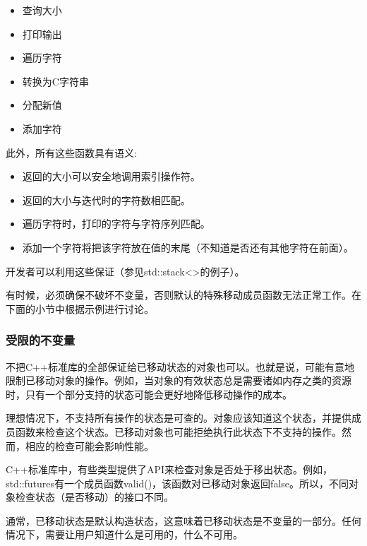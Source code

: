 \begin{itemize}
	\item 查询大小
	\item 打印输出
	\item 遍历字符
	\item 转换为C字符串
	\item 分配新值
	\item 添加字符
\end{itemize}

此外，所有这些函数具有语义:

\begin{itemize}
	\item 返回的大小可以安全地调用索引操作符。
	\item 返回的大小与迭代时的字符数相匹配。
	\item 遍历字符时，打印的字符与字符序列匹配。
	\item 添加一个字符将把该字符放在值的末尾（不知道是否还有其他字符在前面）。
\end{itemize}

开发者可以利用这些保证（参见std::stack<>的例子）。

有时候，必须确保不破坏不变量，否则默认的特殊移动成员函数无法正常工作。在下面的小节中根据示例进行讨论。

\subsubsection{受限的不变量}

不把C++标准库的全部保证给已移动状态的对象也可以。也就是说，可能有意地限制已移动对象的操作。例如，当对象的有效状态总是需要诸如内存之类的资源时，只有一个部分支持的状态可能会更好地降低移动操作的成本。

理想情况下，不支持所有操作的状态是可查的。对象应该知道这个状态，并提供成员函数来检查这个状态。已移动对象也可能拒绝执行此状态下不支持的操作。然而，相应的检查可能会影响性能。

C++标准库中，有些类型提供了API来检查对象是否处于移出状态。例如，std::futures有一个成员函数valid()，该函数对已移动对象返回false。所以，不同对象检查状态（是否移动）的接口不同。

通常，已移动状态是默认构造状态，这意味着已移动状态是不变量的一部分。任何情况下，需要让用户知道什么是可用的，什么不可用。




